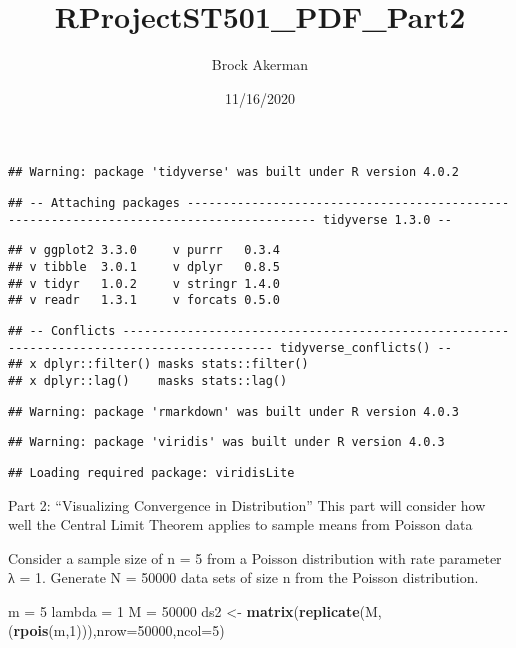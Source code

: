 \documentclass[
]{article}
\title{RProjectST501\_PDF\_Part2}
\author{Brock Akerman}
\date{11/16/2020}
\newenvironment{Shaded}{\begin{snugshade}}{\end{snugshade}}
\newcommand{\DataTypeTok}[1]{\textcolor[rgb]{0.13,0.29,0.53}{#1}}
\newcommand{\DecValTok}[1]{\textcolor[rgb]{0.00,0.00,0.81}{#1}}
\newcommand{\KeywordTok}[1]{\textcolor[rgb]{0.13,0.29,0.53}{\textbf{#1}}}
\newcommand{\NormalTok}[1]{#1}
\newcommand{\StringTok}[1]{\textcolor[rgb]{0.31,0.60,0.02}{#1}}
\begin{document}
\maketitle

\begin{verbatim}
## Warning: package 'tidyverse' was built under R version 4.0.2
\end{verbatim}

\begin{verbatim}
## -- Attaching packages ---------------------------------------------------------------------------------------- tidyverse 1.3.0 --
\end{verbatim}

\begin{verbatim}
## v ggplot2 3.3.0     v purrr   0.3.4
## v tibble  3.0.1     v dplyr   0.8.5
## v tidyr   1.0.2     v stringr 1.4.0
## v readr   1.3.1     v forcats 0.5.0
\end{verbatim}

\begin{verbatim}
## -- Conflicts ------------------------------------------------------------------------------------------- tidyverse_conflicts() --
## x dplyr::filter() masks stats::filter()
## x dplyr::lag()    masks stats::lag()
\end{verbatim}

\begin{verbatim}
## Warning: package 'rmarkdown' was built under R version 4.0.3
\end{verbatim}

\begin{verbatim}
## Warning: package 'viridis' was built under R version 4.0.3
\end{verbatim}

\begin{verbatim}
## Loading required package: viridisLite
\end{verbatim}

Part 2: ``Visualizing Convergence in Distribution'' This part will
consider how well the Central Limit Theorem applies to sample means from
Poisson data

Consider a sample size of n = 5 from a Poisson distribution with rate
parameter λ = 1. Generate N = 50000 data sets of size n from the Poisson
distribution.

\begin{Shaded}
\begin{Highlighting}[]
\NormalTok{m =}\StringTok{ }\DecValTok{5}
\NormalTok{lambda =}\StringTok{ }\DecValTok{1}
\NormalTok{M =}\StringTok{ }\DecValTok{50000}
\NormalTok{ds2 <-}\StringTok{ }\KeywordTok{matrix}\NormalTok{(}\KeywordTok{replicate}\NormalTok{(M,(}\KeywordTok{rpois}\NormalTok{(m,}\DecValTok{1}\NormalTok{))),}\DataTypeTok{nrow=}\DecValTok{50000}\NormalTok{,}\DataTypeTok{ncol=}\DecValTok{5}\NormalTok{)}
\end{Highlighting}
\end{Shaded}
\end{document}
